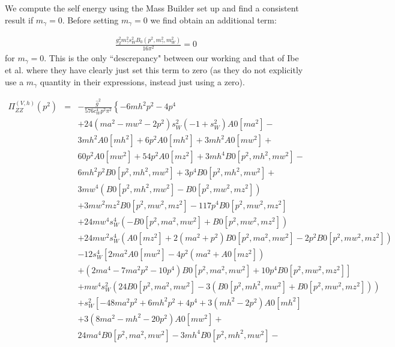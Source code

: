 \documentclass[11pt]{article}
\begin{document}
We compute the self energy using the Mass Builder set up and find a consistent result if $m_{\gamma}=0$.  Before setting $m_{\gamma}=0$ we find obtain an additional term:

\begin{align}
\frac{g_2^2 m_{\gamma}^2 s_W^2 B_0(p^2,m_{\gamma}^2,m_W^2)}{16 \pi^2} = 0
\end{align}
for $m_{\gamma}=0$.  This is the only ``descrepancy" between our working and that of Ibe et al. where they have clearly just set this term to zero (as they do not explicitly use a  $m_{\gamma}$ quantity in their expressions, instead just using a zero).


{
\begin{eqnarray}
\Pi_{ZZ}^{(V,h)}(p^2) &=& 
-\frac{ \hat{g}^2} {576 c_W^4 p^2 \pi^2}\left\{ -6 mh^2 p^2 - 4 p^4 \right.\nonumber \\
&&+  24 (ma^2 - mw^2 - 2 p^2) s_W^2 (-1 + s_W^2) A0[ma^2] -  \nonumber\\
&&   3 mh^2 A0[mh^2] + 6 p^2 A0[mh^2] + 3 mh^2 A0[mw^2] +\nonumber \\
&&   60 p^2 A0[mw^2] + 54 p^2 A0[mz^2] + 3 mh^4 B0[p^2, mh^2, mw^2] -\nonumber \\
&&6 mh^2 p^2 B0[p^2, mh^2, mw^2] + 3 p^4 B0[p^2, mh^2, mw^2] + \nonumber\\
&&   3 mw^4 (B0[p^2, mh^2, mw^2] - B0[p^2, mw^2, mz^2])\nonumber \\
&&   + 3 mw^2 mz^2 B0[p^2, mw^2, mz^2] - 117 p^4 B0[p^2, mw^2, mz^2] \nonumber\\
&&   + 24 mw^4 s_W^4 (-B0[p^2, ma^2, mw^2] + B0[p^2, mw^2, mz^2])\nonumber \\
&&   + 24 mw^2 s_W^4 (A0[mz^2] + 2 (ma^2 + p^2) B0[p^2, ma^2, mw^2] - 2 p^2 B0[p^2, mw^2, mz^2])\nonumber \\
&&   - 12 s_W^4 \left[    2 ma^2 A0[mw^2] -  4 p^2 (ma^2 + A0[mz^2]) \right.\nonumber \\
&& \left. + (2 ma^4 - 7 ma^2 p^2 - 10 p^4) B0[p^2,ma^2, mw^2] + 10 p^4 B0[p^2, mw^2, mz^2]\right] \nonumber\\
&&  + mw^4 s_W^2 (24 B0[p^2, ma^2, mw^2] - 3 (B0[p^2, mh^2, mw^2] + B0[p^2, mw^2, mz^2])) \nonumber\\
&&   +  s_W^2 \left[-48 ma^2 p^2 + 6 mh^2 p^2 + 4 p^4 +  3 (mh^2 - 2 p^2) A0[mh^2] \right.\nonumber\\
&&   +  3 (8 ma^2 - mh^2 - 20 p^2) A0[mw^2] +\nonumber \\
&&      24 ma^4 B0[p^2, ma^2, mw^2] - 3 mh^4 B0[p^2, mh^2, mw^2] - \nonumber\\

\end{eqnarray}}
\end{document}
